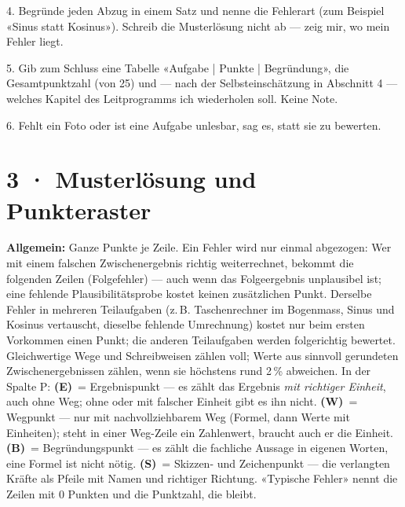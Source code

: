 \documentclass[11pt]{article}
\begin{document}
\begin{tcolorbox}[breakable,colback=lplinie!25,colframe=lplinie,boxrule=0.5pt,arc=1mm,fontupper=\small]
4. Begründe jeden Abzug in einem Satz und nenne die Fehlerart (zum Beispiel «Sinus statt Kosinus»). Schreib die Musterlösung nicht ab — zeig mir, wo mein Fehler liegt.\par
5. Gib zum Schluss eine Tabelle «Aufgabe | Punkte | Begründung», die Gesamtpunktzahl (von 25) und — nach der Selbsteinschätzung in Abschnitt 4 — welches Kapitel des Leitprogramms ich wiederholen soll. Keine Note.\par
6. Fehlt ein Foto oder ist eine Aufgabe unlesbar, sag es, statt sie zu bewerten.
\end{tcolorbox}

\section*{3 · Musterlösung und Punkteraster}
\textbf{Allgemein:} Ganze Punkte je Zeile. Ein Fehler wird nur einmal abgezogen: Wer mit einem falschen Zwischenergebnis
richtig weiterrechnet, bekommt die folgenden Zeilen (Folgefehler) — auch wenn das Folgeergebnis unplausibel ist; eine fehlende
Plausibilitätsprobe kostet keinen zusätzlichen Punkt. Derselbe Fehler in mehreren Teilaufgaben (z.\,B. Taschenrechner im
Bogenmass, Sinus und Kosinus vertauscht, dieselbe fehlende Umrechnung) kostet nur beim ersten Vorkommen einen Punkt; die anderen
Teilaufgaben werden folgerichtig bewertet. Gleichwertige Wege und Schreibweisen zählen voll; Werte aus sinnvoll gerundeten
Zwischenergebnissen zählen, wenn sie höchstens rund 2\,\% abweichen.
In der Spalte P: \textbf{(E)}~= Ergebnispunkt — es zählt das Ergebnis \emph{mit richtiger Einheit}, auch ohne Weg; ohne oder mit
falscher Einheit gibt es ihn nicht. \textbf{(W)}~= Wegpunkt — nur mit nachvollziehbarem Weg (Formel, dann Werte mit Einheiten);
steht in einer Weg-Zeile ein Zahlenwert, braucht auch er die Einheit. \textbf{(B)}~= Begründungspunkt — es zählt die fachliche
Aussage in eigenen Worten, eine Formel ist nicht nötig. \textbf{(S)}~= Skizzen- und Zeichenpunkt — die verlangten Kräfte als Pfeile
mit Namen und richtiger Richtung. «Typische Fehler» nennt die Zeilen mit 0 Punkten und die Punktzahl, die bleibt.
\end{document}
